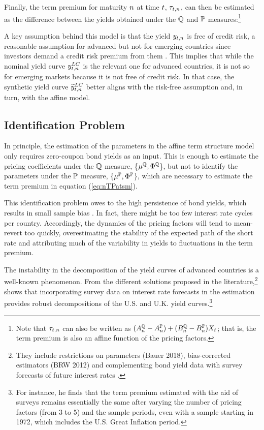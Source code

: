 {Finally, the term premium for maturity \(n\) at time \(t\), \(\tau_{t,n}\), can then be estimated as the difference between the yields obtained under the \(\mathbb{Q}\) and \(\mathbb{P}\) measures:\footnote{ Note that \(\tau_{t,n}\) can also be written as \( (A_{n}^{\mathbb{Q}} - A_{n}^{\mathbb{P}}) + (B_{n}^{\mathbb{Q}}  - B_{n}^{\mathbb{P}}) X_{t} \); that is, the term premium is also an affine function of the pricing factors.}
	
A key assumption behind this model is that the yield \(y_{t,n}\) is free of credit risk, a reasonable assumption for advanced but not for emerging countries since investors demand a credit risk premium from them \citep{DuSchreger:2016JoF}. 
This implies that while the nominal yield curve \(y_{t,n} ^{LC}\) is the relevant one for advanced countries, it is not so for emerging markets because it is not free of credit risk.
In that case, the synthetic yield curve \(\widetilde{y}_{t,n} ^{LC}\) better aligns with the risk-free assumption and, in turn, with the affine model.

\subsection{Identification Problem} \label{sec:Identification}
\iftoggle{toclinks}{\gototoc}{} %

In principle, the estimation of the parameters in the affine term structure model only  requires zero-coupon bond yields as an input.
This is enough to estimate the pricing coefficients under the \(\mathbb{Q}\) measure,
\{\(\mu^{\mathbb{Q}}, \Phi^{\mathbb{Q}}\)\}, but not to identify the parameters under the \(\mathbb{P}\) measure, 
\{\(\mu^{\mathbb{P}}, \Phi^{\mathbb{P}}\)\}, which are necessary to estimate the term premium in equation (\ref{eq:nTPatsm}).

This identification problem owes to the high persistence of bond yields, which results in small sample bias \citep{KimOrphanides:2012}. 
In fact, there might be too few interest rate cycles per country.
Accordingly, the dynamics of the pricing factors will tend to mean-revert too quickly, overestimating the stability of the expected path of the short rate and attributing much of the variability in yields to fluctuations in the term premium.

The instability in the decomposition of the yield curves of advanced countries is a well-known phenomenon.
From the different solutions proposed in the literature,\footnote{ They include restrictions on parameters \citep{Duffee:2010} (Bauer 2018), bias-corrected estimators (BRW 2012) and complementing bond yield data with survey forecasts of future interest rates \citep{KimWright:2005,KimOrphanides:2012}.} 
\cite{Guimaraes:2014} shows that incorporating survey data on interest rate forecasts in the estimation provides robust decompositions of the U.S. and U.K. yield curves.\footnote{ For instance, he finds that the term premium estimated with the aid of surveys remains essentially the same after varying the number of pricing factors (from 3 to 5) and the sample periods, even with a sample starting in 1972, which includes the U.S. Great Inflation period.} 

}
